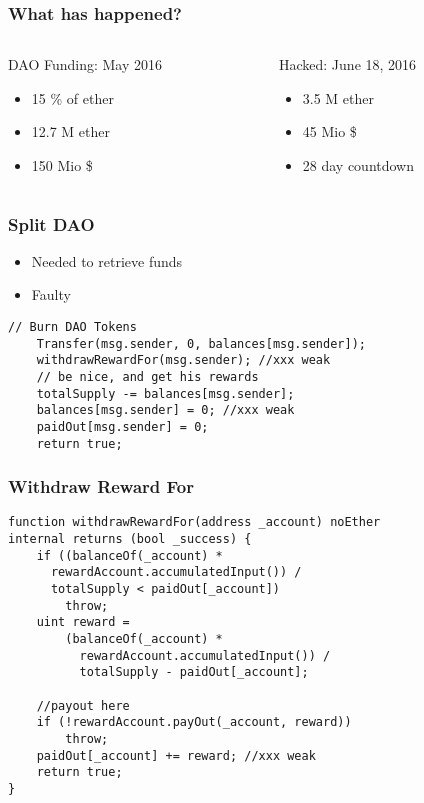 \documentclass{beamer}
\begin{document}
\begin{frame}[fragile]
  \frametitle{What has happened?}
  \begin{columns}
    \begin{column}{0.5\textwidth}
      DAO Funding: May 2016
      \begin{itemize}
        \item 15 \% of ether
        \item 12.7 M ether
        \item 150 Mio \$
      \end{itemize}
    \end{column}
    \pause
    \begin{column}{0.5\textwidth}
      Hacked: June 18, 2016
      \begin{itemize}
        \item 3.5 M ether
        \item 45 Mio \$
        \item 28 day countdown
      \end{itemize}
    \end{column}
  \end{columns}
\end{frame}

\begin{frame}[fragile]
  \frametitle{Split DAO}
  \begin{itemize}
    \item Needed to retrieve funds
    \item Faulty
  \end{itemize}
  \begin{lstlisting}[language=Solidity]
    // Burn DAO Tokens
    Transfer(msg.sender, 0, balances[msg.sender]);
    withdrawRewardFor(msg.sender); //xxx weak
    // be nice, and get his rewards
    totalSupply -= balances[msg.sender];
    balances[msg.sender] = 0; //xxx weak
    paidOut[msg.sender] = 0;
    return true;
  \end{lstlisting}
\end{frame}

\begin{frame}[fragile]
  \frametitle{Withdraw Reward For}
  \begin{lstlisting}[language=Solidity]
function withdrawRewardFor(address _account) noEther 
internal returns (bool _success) {
    if ((balanceOf(_account) * 
      rewardAccount.accumulatedInput()) /
      totalSupply < paidOut[_account])
        throw;
    uint reward =
        (balanceOf(_account) * 
          rewardAccount.accumulatedInput()) /
          totalSupply - paidOut[_account];
    
    //payout here
    if (!rewardAccount.payOut(_account, reward)) 
        throw;
    paidOut[_account] += reward; //xxx weak
    return true;
}
  \end{lstlisting}
\end{frame}
\end{document}
